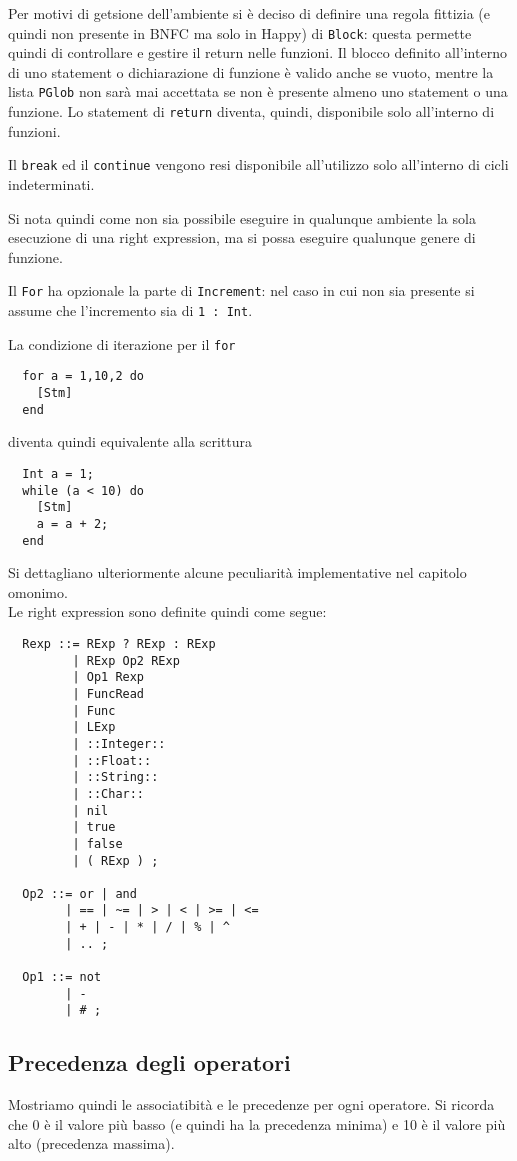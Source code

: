 \documentclass{article}
\begin{document}
Per motivi di getsione dell'ambiente si è deciso di definire una regola fittizia (e quindi non presente in BNFC ma solo
in Happy) di \texttt{Block}: questa permette quindi di controllare e gestire il return nelle funzioni. Il blocco definito
all'interno di uno statement o dichiarazione di funzione è valido anche se vuoto, mentre la lista \texttt{PGlob} non sarà
mai accettata se non è presente almeno uno statement o una funzione. Lo statement di \texttt{return} diventa, quindi, 
disponibile solo all'interno di funzioni.

Il \texttt{break} ed il \texttt{continue} vengono resi disponibile all'utilizzo solo all'interno di cicli indeterminati.

Si nota quindi come non sia possibile eseguire in qualunque ambiente la sola esecuzione di una right expression, ma si
possa eseguire qualunque genere di funzione.

Il \texttt{For} ha opzionale la parte di \texttt{Increment}: nel caso in cui non sia presente si assume che l'incremento
sia di \texttt{1 : Int}.

La condizione di iterazione per il \texttt{for}
\begin{verbatim}
  for a = 1,10,2 do
    [Stm]
  end
\end{verbatim}
diventa quindi equivalente alla scrittura
\begin{verbatim}
  Int a = 1;  
  while (a < 10) do
    [Stm]
    a = a + 2;
  end
\end{verbatim}

Si dettagliano ulteriormente alcune peculiarità implementative nel capitolo omonimo.
~\\

Le right expression sono definite quindi come segue:
\begin{verbatim}
  Rexp ::= RExp ? RExp : RExp
         | RExp Op2 RExp
         | Op1 Rexp
         | FuncRead
         | Func         
         | LExp
         | ::Integer::
         | ::Float::
         | ::String::
         | ::Char::
         | nil
         | true
         | false
         | ( RExp ) ;
         
  Op2 ::= or | and
        | == | ~= | > | < | >= | <=
        | + | - | * | / | % | ^
        | .. ;
  
  Op1 ::= not
        | -
        | # ; 
\end{verbatim}

\subsection*{Precedenza degli operatori}
Mostriamo quindi le associatibità e le precedenze per ogni operatore. Si ricorda che 0 è il valore più basso
(e quindi ha la precedenza minima) e 10 è il valore più alto (precedenza massima).\\
\end{document}
